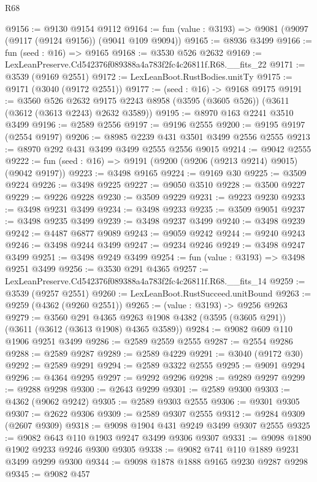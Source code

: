 \begin{lexlean}{R68}
\begin{coremodule}
@9156 := @9130 @9154 @9112
@9164 := fun (value : @3193) => @9081 (@9097 (@9117 (@9124 @9156)) (@9041 @109 @9094))
@9165 := @8936 @3499
@9166 := fun (seed : @16) => @9165
@9168 := @3530 @526 @2632
@9169 := LexLeanPreserve.Cd542376f089388a4a783f2fc4c26811f.R68.__fits_22
@9171 := @3539 (@9169 @2551)
@9172 := LexLeanBoot.RustBodies.unitTy
@9175 := @9171 (@3040 (@9172 @2551))
@9177 := (seed : @16) -> @9168 @9175
@9191 := @3560
    @526
    @2632
    @9175
    @2243
    @8958
    (@3595 (@3605 @526))
    (@3611 (@3612 (@3613 @2243) @2632 @3589))
@9195 := @8970 @163 @2241 @3510 @3499
@9196 := @2589 @2556
@9197 := @9196 @2555
@9200 := @9195 @9197 (@2554 @9197)
@9206 := @8985 @2239 @431 @3501 @3499 @2556 @2555
@9213 := @8970 @292 @431 @3499 @3499 @2555 @2556 @9015
@9214 := @9042 @2555
@9222 := fun (seed : @16) => @9191 (@9200 (@9206 (@9213 @9214) @9015) (@9042 @9197))
@9223 := @3498 @9165
@9224 := @9169 @30
@9225 := @3509 @9224
@9226 := @3498 @9225
@9227 := @9050 @3510
@9228 := @3500 @9227
@9229 := @9226 @9228
@9230 := @3509 @9229
@9231 := @9223 @9230
@9233 := @3498 @9231 @3499
@9234 := @3498 @9233
@9235 := @3509 @9051
@9237 := @3498 @9235 @3499
@9239 := @3498 @9237 @3499
@9240 := @3498 @9239
@9242 := @4487 @6877 @9089
@9243 := @9059 @9242
@9244 := @9240 @9243
@9246 := @3498 @9244 @3499
@9247 := @9234 @9246
@9249 := @3498 @9247 @3499
@9251 := @3498 @9249 @3499
@9254 := fun (value : @3193) => @3498 @9251 @3499
@9256 := @3530 @291 @4365
@9257 := LexLeanPreserve.Cd542376f089388a4a783f2fc4c26811f.R68.__fits_14
@9259 := @3539 (@9257 @2551)
@9260 := LexLeanBoot.RustSucceed.unitBound
@9263 := @9259 (@4362 (@9260 @2551))
@9265 := (value : @3193) -> @9256 @9263
@9279 := @3560
    @291
    @4365
    @9263
    @1908
    @4382
    (@3595 (@3605 @291))
    (@3611 (@3612 (@3613 @1908) @4365 @3589))
@9284 := @9082 @609 @110 @1906 @9251 @3499
@9286 := @2589 @2559 @2555
@9287 := @2554 @9286
@9288 := @2589 @9287
@9289 := @2589 @4229
@9291 := @3040 (@9172 @30)
@9292 := @2589 @9291
@9294 := @2589 @3322 @2555
@9295 := @9091 @9294
@9296 := @4364 @9295
@9297 := @9292 @9296
@9298 := @9289 @9297
@9299 := @9288 @9298
@9300 := @2643 @9299
@9301 := @2589 @9300
@9303 := @4362 (@9062 @9242)
@9305 := @2589 @9303 @2555
@9306 := @9301 @9305
@9307 := @2622 @9306
@9309 := @2589 @9307 @2555
@9312 := @9284 @9309 (@2607 @9309)
@9318 := @9098 @1904 @431 @9249 @3499 @9307 @2555
@9325 := @9082 @643 @110 @1903 @9247 @3499 @9306 @9307
@9331 := @9098 @1890 @1902 @9233 @9246 @9300 @9305
@9338 := @9082 @741 @110 @1889 @9231 @3499 @9299 @9300
@9344 := @9098 @1878 @1888 @9165 @9230 @9287 @9298
@9345 := @9082 @457

\end{coremodule}
\end{lexlean}
